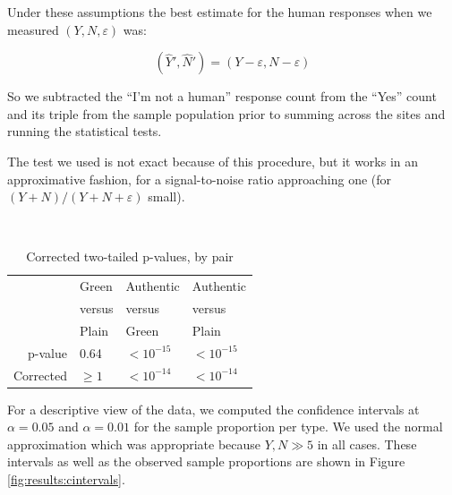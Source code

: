 \documentclass[twoside,letterpaper]{soups}
\begin{document}

Under these assumptions the best estimate for the human responses when we measured $(Y,N,\varepsilon)$ was:

\[ (\hat Y',\hat N')=(Y-\varepsilon,N-\varepsilon) \]

So we subtracted the ``I'm not a human'' response count from the ``Yes'' count and its triple from the sample population prior to summing across the sites and running the statistical tests.

The test we used is not exact because of this procedure, but it works in an approximative fashion,
for a signal-to-noise ratio approaching one (for $(Y+N)/(Y+N+\varepsilon)$ small).

\begin{table}
\centering
\caption{Corrected two-tailed p-values, by pair}
\mbox{}\\
\begin{tabular}{|r|l|l|l|}
\hline
                    & Green     & Authentic             & Authentic \\
                    & versus    & versus                & versus    \\
                    & Plain     & Green                 & Plain     \\
\hline
p-value             & 0.64    & $<10^{-15}$ & $<10^{-15}$ \\
\hline
Corrected           & $\ge 1$   & $<10^{-14}$ & $<10^{-14}$ \\
\hline
\end{tabular}
\label{fig:results:pvalues}
\end{table}

For a descriptive view of the data, we computed the confidence intervals at $\alpha = 0.05$ and $\alpha = 0.01$ for the sample proportion per type. We used the normal approximation which was appropriate because $Y, N \gg 5$ in all cases. These intervals as well as the observed sample proportions are shown in Figure \ref{fig:results:cintervals}.
\end{document}
